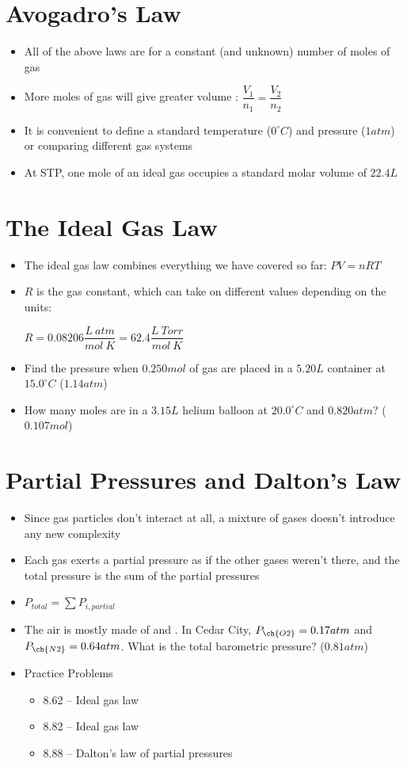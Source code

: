 \documentclass[12pt, openany, letterpaper]{memoir}
\begin{document}
\section{Avogadro's Law}
\begin{itemize}
	\item All of the above laws are for a constant (and unknown) number of moles of gas
	\item More moles of gas will give greater volume : $\dfrac{V_1}{n_1} = \dfrac{V_2}{n_2}$
	\item It is convenient to define a standard temperature ($0^\circ C$) and pressure ($1atm$) or comparing different gas systems
	\item At STP, one mole of an ideal gas occupies a standard molar volume of $22.4L$	
\end{itemize}
\section{The Ideal Gas Law}
\begin{itemize}
	\item The ideal gas law combines everything we have covered so far: $PV=nRT$
	\item $R$ is the gas constant, which can take on different values depending on the units:
	
	$R=0.08206\dfrac{L~atm}{mol~K} = 62.4\dfrac{L~Torr}{mol~K}$
	\item Find the pressure when $0.250mol$ of gas are placed in a $5.20L$ container at $15.0^\circ C$ ($1.14atm$)
	\item How many moles are in a $3.15L$ helium balloon at $20.0^\circ C$ and $0.820atm$? ($0.107mol$)
\end{itemize}
\section{Partial Pressures and Dalton's Law}
\begin{itemize}
	\item Since gas particles don't interact at all, a mixture of gases doesn't introduce any new complexity
	\item Each gas exerts a partial pressure as if the other gases weren't there, and the total pressure is the sum of the partial pressures
	\item $P_{total} = \sum P_{i, partial}$
	\item The air is mostly made of  and . In Cedar City, $P_{\ch{O2}}=0.17atm$ and $P_{\ch{N2}}=0.64atm$. What is the total barometric pressure? ($0.81atm$)
	\item Practice Problems
	\begin{itemize}
		\item 8.62 -- Ideal gas law
		\item 8.82 -- Ideal gas law
		\item 8.88 -- Dalton's law of partial pressures
	\end{itemize}
\end{itemize}
\end{document}
